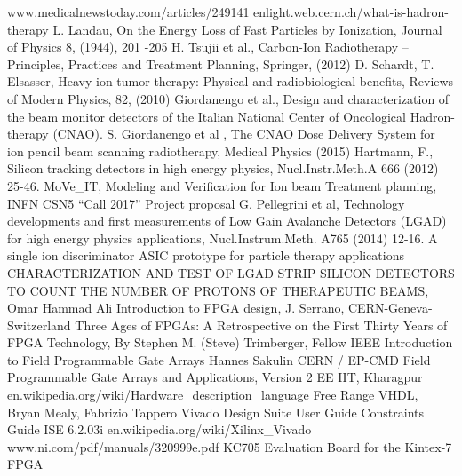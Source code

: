\begin{thebibliography}{00}	
	www.medicalnewstoday.com/articles/249141
	enlight.web.cern.ch/what-is-hadron-therapy
	L. Landau, On the Energy Loss of Fast Particles by Ionization, Journal of
	Physics 8, (1944), 201 -205
	H. Tsujii et al., Carbon-Ion Radiotherapy – Principles, Practices and Treatment
	Planning, Springer, (2012)
	D. Schardt, T. Elsasser, Heavy-ion tumor therapy: Physical and radiobiological
	benefits, Reviews of Modern Physics, 82, (2010)
	Giordanengo et al., Design and characterization of the beam monitor detectors
	of the Italian National Center of Oncological Hadron-therapy (CNAO).
	S. Giordanengo et al , The CNAO Dose Delivery System for ion pencil beam
	scanning radiotherapy, Medical Physics (2015)
	Hartmann, F., Silicon tracking detectors in high energy physics, Nucl.Instr.Meth.A
	666 (2012) 25-46.
	MoVe\_IT, Modeling and Verification for Ion beam Treatment planning, INFN CSN5 “Call 2017” Project proposal
	G. Pellegrini et al, Technology developments and first measurements of Low Gain Avalanche Detectors (LGAD) for high energy physics applications, Nucl.Instrum.Meth. A765 (2014) 12-16.
	A single ion discriminator ASIC prototype for particle therapy applications
	CHARACTERIZATION AND TEST OF LGAD STRIP SILICON DETECTORS TO COUNT THE NUMBER OF PROTONS OF THERAPEUTIC BEAMS, Omar Hammad Ali
	Introduction to FPGA design, J. Serrano, CERN-Geneva-Switzerland
	Three Ages of FPGAs: A Retrospective on the First Thirty Years of FPGA Technology, By Stephen M. (Steve) Trimberger, Fellow IEEE
	Introduction to Field Programmable Gate Arrays Hannes Sakulin CERN / EP-CMD
	Field Programmable Gate Arrays and Applications, Version 2 EE IIT, Kharagpur
	en.wikipedia.org/wiki/Hardware\_description\_language
	Free Range VHDL, Bryan Mealy, Fabrizio Tappero
	Vivado Design Suite User Guide
	\thispagestyle{plain}
	Constraints Guide ISE 6.2.03i
	en.wikipedia.org/wiki/Xilinx\_Vivado
	www.ni.com/pdf/manuals/320999e.pdf
	KC705 Evaluation Board for the Kintex-7 FPGA	

\end{thebibliography}
